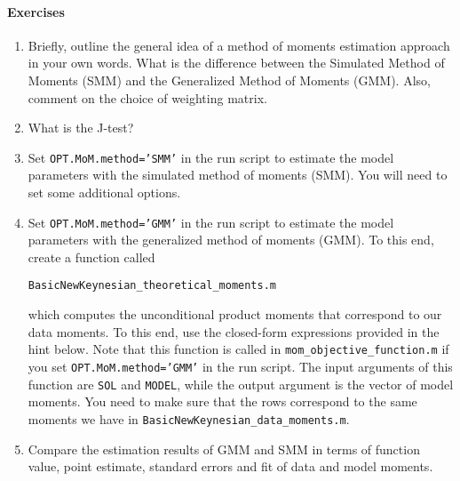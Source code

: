 \documentclass{article}
\begin{document}
\paragraph{Exercises}
\begin{enumerate}	
	\item Briefly, outline the general idea of a method of moments estimation approach in your own words. What is the difference between the Simulated Method of Moments (SMM) and the Generalized Method of Moments (GMM). Also, comment on the choice of weighting matrix.
	\item What is the J-test?
	\item Set \texttt{OPT.MoM.method='SMM'} in the run script to estimate the model parameters with the simulated method of moments (SMM). You will need to set some additional options.
	\item Set \texttt{OPT.MoM.method='GMM'} in the run script to estimate the model parameters with the generalized method of moments (GMM). To this end, create a function called
	\begin{center} \texttt{BasicNewKeynesian\_theoretical\_moments.m}\end{center}
	which computes the unconditional product moments that correspond to our data moments. To this end, use the closed-form expressions provided in the hint below.  Note that this function is called in \texttt{mom\_objective\_function.m} if you set \texttt{OPT.MoM.method='GMM'} in the run script. The input arguments of this function are \texttt{SOL} and \texttt{MODEL}, while the output argument is the vector of model moments. You need to make sure that the rows correspond to the same moments we have in \texttt{BasicNewKeynesian\_data\_moments.m}.
	\item Compare the estimation results of GMM and SMM in terms of function value, point estimate, standard errors and fit of data and model moments.
\end{enumerate}
\end{document}
